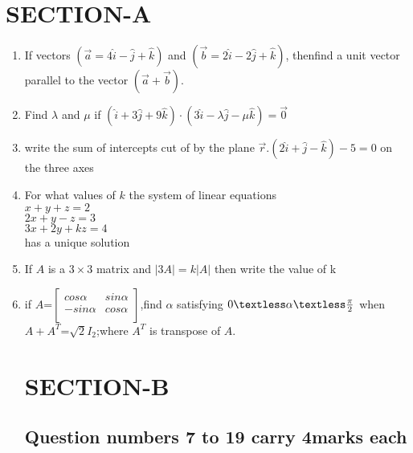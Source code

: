 \documentclass{article}
\begin{document}
\section*{\centering SECTION-A}
\begin{enumerate}
	\item If vectors $(\vec{a} = 4\hat{i} - \hat{j} + \hat{k})$ and $(\vec{b} = 2\hat{i} - 2\hat{j} + \hat{k})$, thenfind a unit vector parallel to the vector $(\vec{a} + \vec{b})$.

 \item Find \(\lambda\) and \(\mu\) if 
     $(\hat{i} +3\hat{j} + 9\hat{k}) \cdot (3\hat{i} - \lambda \hat{j} - \mu \hat{k}) =\overset\rightarrow 0$
  

  \item  write the sum of intercepts cut of by the plane $    \overset{\rightarrow}{r}.(2\hat{i}+\hat{j}-\hat{k})-5=0$     on the three axes



\item For what values of $k$ the system of linear equations\\
$x+y+z=2$\\
$2x+y-z=3$\\
$3x+2y+kz=4$\\
has a unique solution

\item If $A$ is a \(3\times3\) matrix and $|3A|=k|A|$ then     write the value of k



\item if  $A$=$\left[\begin{matrix}
cos\alpha&sin\alpha\\-sin\alpha&cos\alpha\\
\end{matrix}
\right]$,find $\alpha$ satisfying $0\textless\alpha\textless\frac{\pi}{2}    $ when $A+A^T$=$\sqrt{2}$$I_{2}$;where $A^T$ is transpose of $A$.



		\section*{\centering SECTION-B}
		\subsection*{\centering Question numbers 7 to 19 carry 4marks each}
  



\end{enumerate}
\end{document}
